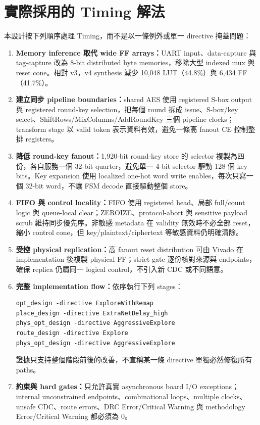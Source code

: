 \documentclass[UTF8,fontset=none,11pt,a4paper]{ctexrep}
\begin{document}
\section{實際採用的 Timing 解法}

本設計按下列順序處理 Timing，而不是以一條例外或單一 directive 掩蓋問題：

\begin{enumerate}
  \item \textbf{Memory inference 取代 wide FF arrays：}UART input、data-capture 與 tag-capture 改為 8-bit distributed byte memories，移除大型 indexed mux 與 reset cone。相對 v3，v4 synthesis 減少 10,048 LUT（44.8\%）與 6,434 FF（41.7\%）。
  \item \textbf{建立同步 pipeline boundaries：}shared AES 使用 registered S-box output 與 registered round-key selection，把每個 round 拆成 issue、S-box/key select、ShiftRows/MixColumns/AddRoundKey 三個 pipeline clocks；transform stage 以 valid token 表示資料有效，避免一條高 fanout CE 控制整排 registers。
  \item \textbf{降低 round-key fanout：}1,920-bit round-key store 的 selector 複製為四份，各自服務一個 32-bit quarter，避免單一 4-bit selector 驅動 128 個 key bits。Key expansion 使用 localized one-hot word write enables，每次只寫一個 32-bit word，不讓 FSM decode 直接驅動整個 store。
  \item \textbf{FIFO 與 control locality：}FIFO 使用 registered head、局部 full/count logic 與 queue-local clear；ZEROIZE、protocol-abort 與 sensitive payload scrub 維持同步優先序。非敏感 metadata 在 validity 無效時不必全部 reset，縮小 control cone，但 key/plaintext/ciphertext 等敏感資料仍明確清除。
  \item \textbf{受控 physical replication：}高 fanout reset distribution 可由 Vivado 在 implementation 後複製 physical FF；strict gate 逐份核對來源與 endpoints，確保 replica 仍屬同一 logical control，不引入新 CDC 或不同語意。
  \item \textbf{完整 implementation flow：}依序執行下列 stages：
\begin{lstlisting}[basicstyle=\ttfamily\footnotesize]
opt_design -directive ExploreWithRemap
place_design -directive ExtraNetDelay_high
phys_opt_design -directive AggressiveExplore
route_design -directive Explore
phys_opt_design -directive AggressiveExplore
\end{lstlisting}
  證據只支持整個階段前後的改善，不宣稱某一條 directive 單獨必然修復所有 paths。
  \item \textbf{約束與 hard gates：}只允許真實 asynchronous board I/O exceptions；internal unconstrained endpoints、combinational loops、multiple clocks、unsafe CDC、route errors、DRC Error/Critical Warning 與 methodology Error/Critical Warning 都必須為 0。
\end{enumerate}
\end{document}
